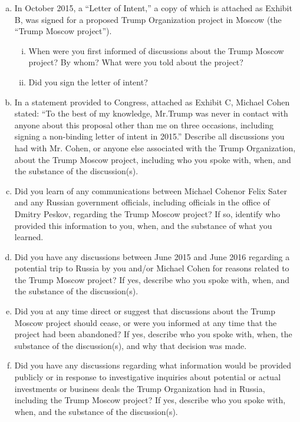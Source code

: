 \begin{enumerate}[a.]

\item In October 2015, a “Letter of Intent,” a copy of which is attached as Exhibit B, was signed for a proposed Trump Organization project in Moscow (the “Trump Moscow project”).

\begin{enumerate}[i.]

\item When were you first informed of discussions about the Trump Moscow project?
By whom?
What were you told about the project?

\item Did you sign the letter of intent?

\end{enumerate}

\item In a statement provided to Congress, attached as Exhibit C, Michael Cohen stated: “To the best of my knowledge, Mr.Trump was never in contact with anyone about this proposal other than me on three occasions, including signing a non-binding letter of intent in 2015.”
Describe all discussions you had with Mr. Cohen, or anyone else associated with the Trump Organization, about the Trump Moscow project, including who you spoke with, when, and the substance of the discussion(s).

\item Did you learn of any communications between Michael Cohenor Felix Sater and any Russian government officials, including officials in the office of Dmitry Peskov, regarding the Trump Moscow project?
If so, identify who provided this information to you, when, and the substance of what you learned.

\item Did you have any discussions between June 2015 and June 2016 regarding a potential trip to Russia by you and/or Michael Cohen for reasons related to the Trump Moscow project?
If yes, describe who you spoke with, when, and the substance of the discussion(s).

\item Did you at any time direct or suggest that discussions about the Trump Moscow project should cease, or were you informed at any time that the project had been abandoned?
If yes, describe who you spoke with, when, the substance of the discussion(s), and why that decision was made.

\item Did you have any discussions regarding what information would be provided publicly or in response to investigative inquiries about potential or actual investments or business deals the Trump Organization had in Russia, including the Trump Moscow project?
If yes, describe who you spoke with, when, and the substance of the discussion(s).


\end{enumerate}
